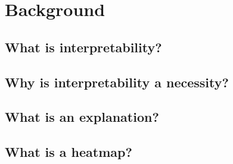 \section{Background}
\blindtext[3]

\subsection{What is interpretability?}
\blindtext[3]

\subsection{Why is interpretability a necessity?}
\blindtext[3]

\subsection{What is an explanation?}
\blindtext[3]

\subsection{What is a heatmap?}
\blindtext[3]